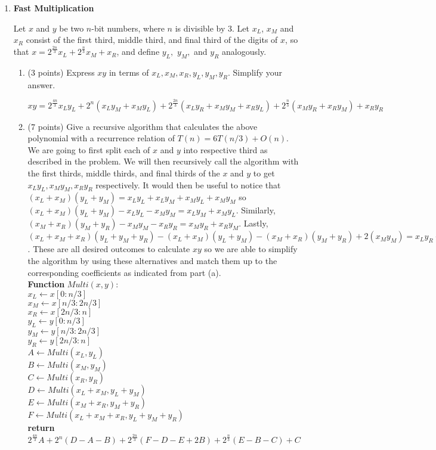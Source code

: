 \documentclass[11pt]{article}
\begin{document}
\begin{enumerate}
    \item \textbf{Fast Multiplication}
    
    Let $x$ and $y$ be two $n$-bit numbers, where $n$ is divisible by 3. Let $x_L$, $x_M$ and $x_R$ consist of the first third, middle third, and final third of the digits of $x$, so that $x = 2^{\frac{2n}{3}}x_L + 2^{\frac{n}{3}}x_M + x_R$, and define $y_L,$ $y_M,$ and $y_R$ analogously.
    
    \begin{enumerate}
        \item (3 points) Express $xy$ in terms of $x_L,x_M,x_R,y_L,y_M,y_R$. Simplify your answer.
        
        $xy = 2^{\frac{4n}{3}}x_Ly_L+2^n(x_Ly_M+x_My_L) + 2^{\frac{2n}{3}}(x_Ly_R+x_My_M+x_Ry_L)+2^{\frac{n}{3}}(x_My_R+x_Ry_M)+x_Ry_R$
        
        \item (7 points) Give a recursive algorithm that calculates the above polynomial with a recurrence relation of $T(n) = 6T(n/3) + O(n)$.\\
        
        We are going to first split each of $x$ and $y$ into respective third as described in the problem. We will then recursively call the algorithm with the first thirds, middle thirds, and final thirds of the $x$ and $y$ to get $x_Ly_L, x_My_M, x_Ry_R$ respectively. It would then be useful to notice that $(x_L+x_M)(y_L+y_M) = x_Ly_L+x_Ly_M+x_My_L+x_My_M$ so $(x_L+x_M)(y_L+y_M) - x_Ly_L-x_My_M= x_Ly_M+x_My_L$. Similarly, $(x_M+x_R)(y_M+y_R) - x_My_M-x_Ry_R= x_My_R+x_Ry_M$. Lastly, $(x_L+x_M+x_R)(y_L+y_M+y_R) -  (x_L+x_M)(y_L+y_M) - (x_M+x_R)(y_M+y_R) + 2(x_My_M)= x_Ly_R+x_My_M+x_Ry_L$. These are all desired outcomes to calculate $xy$ so we are able to simplify the algorithm by using these alternatives and match them up to the corresponding coefficients as indicated from part (a).\\
        
        \textbf{Function} $Multi(x, y)$:\\
        $x_L \leftarrow x[0: n/3]$\\
        $x_M \leftarrow x[n/3: 2n/3]$\\
        $x_R \leftarrow x[2n/3: n]$\\
        $y_L \leftarrow y[0: n/3]$\\
        $y_M \leftarrow y[n/3: 2n/3]$\\
        $y_R \leftarrow y[2n/3: n]$\\
        $A \leftarrow Multi(x_L,y_L)$\\
        $B \leftarrow Multi(x_M,y_M)$\\
        $C \leftarrow Multi(x_R,y_R)$\\
        $D \leftarrow Multi(x_L+x_M, y_L+y_M)$\\
        $E \leftarrow Multi(x_M+x_R, y_M+y_R)$\\
        $F \leftarrow Multi(x_L+x_M+x_R, y_L+y_M+y_R)$\\
        \textbf{return} $2^{\frac{4n}{3}} A+2^n (D-A-B)+2^{\frac{2n}{3}} (F-D-E+2B)+2^{\frac{n}{3}} (E-B-C)+C$
        

\end{enumerate}
\end{enumerate}
\end{document}
